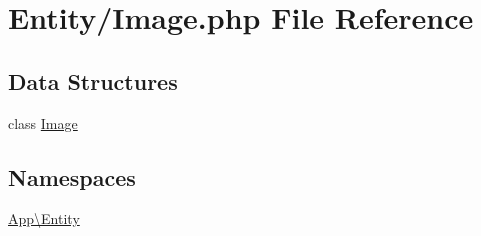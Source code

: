 \hypertarget{_image_8php}{}\section{Entity/\+Image.php File Reference}
\label{_image_8php}
\subsection*{Data Structures}
\begin{DoxyCompactItemize}
\item 
class \mbox{\hyperlink{class_app_1_1_entity_1_1_image}{Image}}
\end{DoxyCompactItemize}
\subsection*{Namespaces}
\begin{DoxyCompactItemize}
\item 
 \mbox{\hyperlink{namespace_app_1_1_entity}{App\textbackslash{}\+Entity}}
\end{DoxyCompactItemize}

